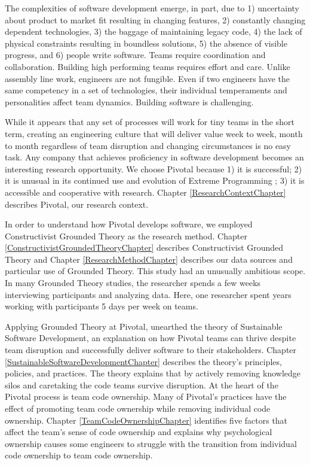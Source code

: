 The complexities of software development emerge, in part, due to 1) uncertainty about product to market fit resulting in changing features, 2) constantly changing dependent technologies, 3) the baggage of maintaining legacy code, 4) the lack of physical constraints resulting in boundless solutions, 5) the absence of visible progress, and 6) people write software. Teams require coordination and collaboration. Building high performing teams requires effort and care. Unlike assembly line work, engineers are not fungible. Even if two engineers have the same competency in a set of technologies, their individual temperaments and personalities affect team dynamics. Building software is challenging. 


While it appears that any set of processes will work for tiny teams in the short term, creating an engineering culture that will deliver value week to week, month to month regardless of team disruption and changing circumstances is no easy task. Any company that achieves proficiency in software development becomes an interesting research opportunity. We choose Pivotal because 1) it is successful; 2) it is unusual in its continued use and evolution of Extreme Programming \cite{BeckExtremeProgramming2004}; 3) it is accessible and cooperative with research. Chapter \ref{ResearchContextChapter} describes Pivotal, our research context. 


In order to understand how Pivotal develops software, we employed Constructivist Grounded Theory as the research method. Chapter \ref{ConstructivistGroundedTheoryChapter} describes Constructivist Grounded Theory and Chapter \ref{ResearchMethodChapter} describes our data sources and particular use of Grounded Theory. This study had an unusually ambitious scope. In many Grounded Theory studies, the researcher spends a few weeks interviewing participants and analyzing data. Here, one researcher spent \durationOfResearchStudy{} years working with participants 5 days per week on \numberOfObservedProjects{} teams. 


Applying Grounded Theory at Pivotal, unearthed the theory of Sustainable Software Development, an explanation on how Pivotal teams can thrive despite team disruption and successfully deliver software to their stakeholders. Chapter \ref{SustainableSoftwareDevelopmentChapter} describes the theory's principles, policies, and practices. The theory explains that by actively removing knowledge silos and caretaking the code teams survive disruption.  At the heart of the Pivotal process is team code ownership. Many of Pivotal's practices have the effect of promoting team code ownership while removing individual code ownership. Chapter \ref{TeamCodeOwnershipChapter} identifies five factors that affect the team's sense of code ownership and explains why psychological ownership causes some engineers to struggle with the transition from individual code ownership to team code ownership. 



